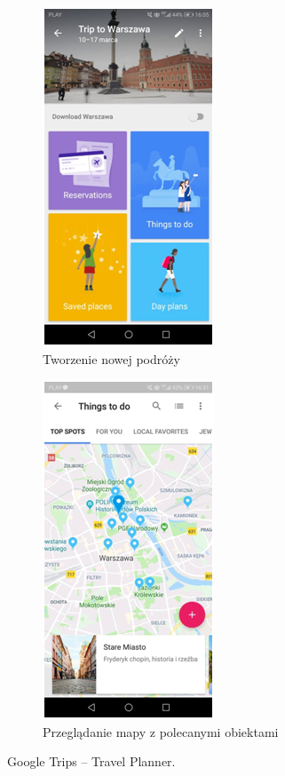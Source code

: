 \documentclass[10pt,twoside,a4paper]{report}
\begin{document}
\begin{figure}[h]
\begin{subfigure}{0.5\textwidth}
\centering
\includegraphics[width=0.9\linewidth, width=5cm]{googletrips1}
\caption{Tworzenie nowej podróży}
\label{fig:GTsubim1}
\end{subfigure}
\begin{subfigure}{0.5\textwidth}
\centering
\includegraphics[width=0.9\linewidth, width=5cm]{googletrips2}
\caption{Przeglądanie mapy z polecanymi obiektami}
\label{fig:GTsubim2}
\end{subfigure}
\caption{Google Trips -- Travel Planner.}
\label{fig:GTimage1}
\end{figure}
\end{document}
